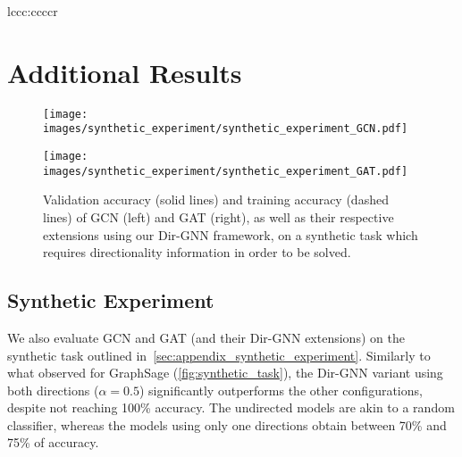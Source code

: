 \documentclass{article}
\newcommand\oursacro{Dir-GNN}
\theoremstyle{plain}
\theoremstyle{definition}
\theoremstyle{remark}
\begin{document}
\begin{table*}[t]
\begin{center}
\begin{small}
\begin{sc}
{\begin{tabular}{lccc:ccccr}
\bottomrule
\end{tabular}}
\end{sc}
\end{small}
\end{center}
\caption{Ablation study comparing base MPNNs on the undirected graph versus their \oursacro{} extensions on the directed graph. We conducted experiments with $\alpha=0$ (only in-edges), $\alpha=1$ (only out-edges), and $\alpha=0.5$ (both in- and out-edges, but with different weight matrices). For homophilic datasets (to the left of the dashed line), incorporating directionality does not significantly enhance or may slightly impair performance. However, for heterophilic datasets (to the right of the dashed line), the inclusion of directionality substantially improves accuracy.}
\label{tab:full_direction_ablation}
\end{table*}
 \section{Additional Results}

\begin{figure}[t!]
\centering
\label{fig:synthetic_gcn_gat}
\begin{minipage}[t]{0.5\linewidth}
  \centering
  \texttt{[image: images/synthetic\_experiment/synthetic\_experiment\_GCN.pdf]}
\end{minipage}\begin{minipage}[t]{.5\linewidth}
  \centering
  \texttt{[image: images/synthetic\_experiment/synthetic\_experiment\_GAT.pdf]}
\end{minipage}
\caption{Validation accuracy (solid lines) and training accuracy (dashed lines) of GCN (left) and GAT (right), as well as their respective extensions using our \oursacro{} framework, on a synthetic task which requires directionality information in order to be solved.}
  \label{fig:synthetic-gcn-gat}
\end{figure}

\subsection{Synthetic Experiment}
We also evaluate GCN and GAT (and their \oursacro{} extensions) on the synthetic task outlined in~\cref{sec:appendix_synthetic_experiment}. Similarly to what observed for GraphSage (\cref{fig:synthetic_task}), the \oursacro{} variant using both directions ($\alpha=0.5$) significantly outperforms the other configurations, despite not reaching 100\% accuracy. The undirected models are akin to a random classifier, whereas the models using only one directions obtain between 70\% and 75\% of accuracy.
\end{document}
